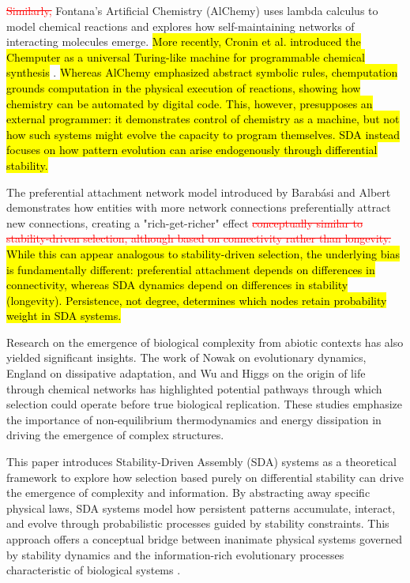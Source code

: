 \documentclass[preprint,12pt]{elsarticle}
\newcommand{\added}[1]{\hl{#1}}
\newcommand{\deleted}[1]{\textcolor{red}{\sout{#1}}}
\begin{document}
\deleted{Similarly, }Fontana's Artificial Chemistry (AlChemy) \cite{fontana1991algorithmic} uses lambda calculus to model chemical reactions and explores how self-maintaining networks of interacting molecules emerge. 
\added{More recently, Cronin et al. introduced the Chemputer as a universal
Turing-like machine for programmable chemical synthesis}
\cite{cronin2024chemputation}. \added{Whereas AlChemy emphasized abstract symbolic
rules, chemputation grounds computation in the physical execution of reactions,
showing how chemistry can be automated by digital code. This, however,
presupposes an external programmer: it demonstrates control of chemistry as a
machine, but not how such systems might evolve the capacity to program
themselves. SDA instead focuses on how pattern evolution can arise
endogenously through differential stability.}

The preferential attachment network model introduced by Barabási and Albert \cite{barabasi1999emergence} demonstrates how entities with more network connections preferentially attract new connections, creating a "rich-get-richer" effect \deleted{conceptually similar to stability-driven selection, although based on connectivity rather than longevity.} \added{While this can appear analogous to
stability-driven selection, the underlying bias is fundamentally different:
preferential attachment depends on differences in connectivity, whereas SDA
dynamics depend on differences in stability (longevity). Persistence, not
degree, determines which nodes retain probability weight in SDA systems.}

Research on the emergence of biological complexity from abiotic contexts has also yielded significant insights. The work of Nowak \cite{nowak2006evolutionary} on evolutionary dynamics, England \cite{england2015dissipative} on dissipative adaptation, and Wu and Higgs \cite{wu2012origin} on the origin of life through chemical networks has highlighted potential pathways through which selection could operate before true biological replication. These studies emphasize the importance of non-equilibrium thermodynamics \cite{prigogine1977self, nicolis1977self} and energy dissipation in driving the emergence of complex structures.

This paper introduces Stability-Driven Assembly (SDA) systems as a theoretical framework to explore how selection based purely on differential stability can drive the emergence of complexity and information. By abstracting away specific physical laws, SDA systems model how persistent patterns accumulate, interact, and evolve through probabilistic processes guided by stability constraints. This approach offers a conceptual bridge between inanimate physical systems governed by stability dynamics and the information-rich evolutionary processes characteristic of biological systems \cite{noble2012causality, ellis2012top}.
\end{document}
